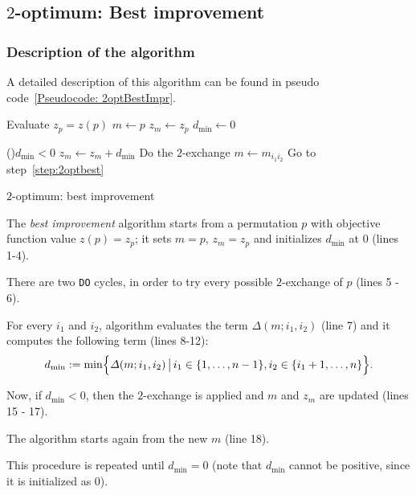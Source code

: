 \subsection{$2$-optimum: Best improvement}
\subsubsection{Description of the algorithm}
A detailed description of this algorithm can be found in pseudo code~\ref{Pseudocode: 2optBestImpr}.
\begin{algorithm}%
	Evaluate $z_p =z(p)$\;
	$m\gets p$\; 
	$z_m \gets z_p$\;
	$d_\mathrm{min} \gets 0$\;\label{step:2optbest}
	{
	}

	\If(){$ d_\mathrm{min} < 0$}{
		$z_m \gets z_m + d_\mathrm{min}$\;
		Do the $2$-exchange $m \gets m_{i_1i_2}$\;
		Go to step~\ref{step:2optbest}\;			
	}
	
	
	\caption{$2$-optimum: best improvement}
	\label{Pseudocode: 2optBestImpr}
\end{algorithm}



The \textit{best improvement} algorithm starts from a permutation $p$ with objective function value $z(p)=z_p$; it sets $m = p$, $z_m=z_p$ and  initializes $d_\mathrm{min}$ at $0$ (lines 1-4).

There are two  \texttt{DO} cycles, in order to try every possible  $2$-exchange of $p$ (lines 5 - 6).


For every $i_1$ and $i_2$, algorithm evaluates the term $\Delta(m;i_1,i_2)$ (line 7) and it computes the following term (lines 8-12):
\[ d_\mathrm{min}:=\min\Bigl\{\Delta(m;i_1,i_2) \, \big| \, i_1\in\{1,\dots,n-1\},i_2\in\{i_1+1,\dots,n\}\Bigr\}.\] 	 



\noindent Now, if $d_\mathrm{min}<0$, then the $2$-exchange is applied and $m$ and $z_m$ are updated (lines 15 - 17).

 The algorithm starts again from the new $m$ (line 18).

This procedure is repeated until $d_\mathrm{min}=0$ (note that $d_\mathrm{min}$ cannot be positive, since it is initialized as $0$).

